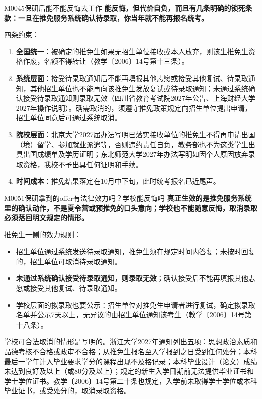 \begin{qa}{M0045}{保研后能不能反悔去工作}
\textbf{能反悔，但代价自负，而且有几条明确的锁死条款：一旦在推免服务系统确认待录取，你当年就不能再报名统考。}

四条约束：

\begin{enumerate}
  \item \textbf{全国统一}：被确定的推免生如果无招生单位接收或本人放弃，则该生推免生资格作废，名额不得转让（教学〔2006〕14号第十三条）。
  \item \textbf{系统层面}：接受待录取通知后不能再填报其他志愿或接受其他复试、待录取通知，其他招生单位也不能再向该推免生发放复试或待录取通知；未通过系统确认接受待录取通知则录取无效（四川省教育考试院2027年公告、上海财经大学2027年操作说明）。确需取消的，须遵守推免政策规定向招生单位提出申请，招生单位同意后可通过系统取消。
  \item \textbf{院校层面}：北京大学2027届办法写明已落实接收单位的推免生不得再申请出国（境）留学、参加就业派遣等，否则违约责任自负，教务部也不为这类学生出具出国成绩单及学历证明；东北师范大学2027年办法写明如因个人原因放弃录取资格，我校不予出具任何证明和手续。
  \item \textbf{时间成本}：推免结果落定在10月中下旬，此时统考报名已近尾声。
\end{enumerate}
\end{qa}

\begin{qa}{M0051}{保研拿到的offer有法律效力吗？学校能反悔吗}
\textbf{真正生效的是推免服务系统里的确认动作，不是夏令营或预推免的口头意向；学校也不能随意反悔，取消录取必须落回明文规定的情形。}

推免生一侧的效力规则：

\begin{itemize}
  \item 招生单位通过系统发送待录取通知，推免生须在规定时间内答复；未按时回复的，招生单位可取消待录取通知。
  \item \textbf{未通过系统确认接受待录取通知，则录取无效}；确认接受后不能再填报其他志愿或接受其他复试、待录取通知。
  \item 学校层面的拟录取也要公示：招生单位对推免生申请者进行复试，确定拟录取名单并公示7天以上，无异议的由招生单位通知该考生（教学〔2006〕14号第十八条）。
\end{itemize}

学校可合法取消的情形是写明的。浙江大学2027年通知列出五项：思想政治素质和品德考核不合格或政审不合格；从推免生报名至入学报到之日受到任何处分；本科最后一学年计入毕业要求学分的课程出现不及格记录；本科毕业设计（论文）成绩未达到良好及以上（或80分及以上）；规定的新生入学日期前无法提供毕业证书和学士学位证书。教学〔2006〕14号第二十条也规定，入学前未取得学士学位或本科毕业证书，或受处分的，取消录取资格。
\end{qa}

